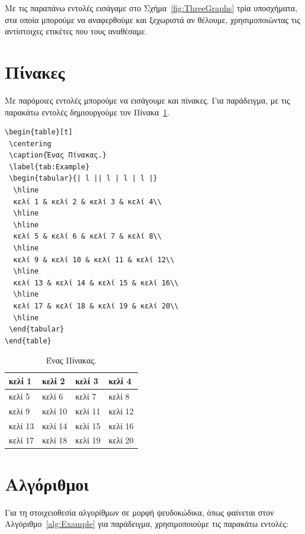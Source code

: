 Με τις παραπάνω εντολές εισάγαμε στο Σχήμα~\ref{fig:ThreeGraphs} τρία υποσχήματα, στα οποία μπορούμε να αναφερθούμε και ξεχωριστά αν θέλουμε, χρησιμοποιώντας τις αντίστοιχες ετικέτες που τους αναθέσαμε.


\section{Πίνακες}
\label{sec:Tables}
Με παρόμοιες εντολές μπορούμε να εισάγουμε και πίνακες.
Για παράδειγμα, με τις παρακάτω εντολές δημιουργούμε τον Πίνακα~\ref{tab:Example}.

\begin{verbatim}
\begin{table}[t]
 \centering
 \caption{Ένας Πίνακας.}
 \label{tab:Example}
 \begin{tabular}{| l || l | l | l |}
  \hline
  κελί 1 & κελί 2 & κελί 3 & κελί 4\\
  \hline
  \hline
  κελί 5 & κελί 6 & κελί 7 & κελί 8\\
  \hline
  κελί 9 & κελί 10 & κελί 11 & κελί 12\\
  \hline
  κελί 13 & κελί 14 & κελί 15 & κελί 16\\
  \hline
  κελί 17 & κελί 18 & κελί 19 & κελί 20\\
  \hline
 \end{tabular}
\end{table}
\end{verbatim}

\begin{table}[t]
	\centering
	\caption{Ένας Πίνακας.}
	\label{tab:Example}
	\begin{tabular}{| l || l | l | l |}
		\hline
		κελί 1 & κελί 2 & κελί 3 & κελί 4\\
		\hline
		\hline
		κελί 5 & κελί 6 & κελί 7 & κελί 8\\
		\hline
		κελί 9 & κελί 10 & κελί 11 & κελί 12\\
		\hline
		κελί 13 & κελί 14 & κελί 15 & κελί 16\\
		\hline
		κελί 17 & κελί 18 & κελί 19 & κελί 20\\
		\hline
	\end{tabular}
\end{table}


\section{Αλγόριθμοι}
\label{sec:Algorithms}
Για τη στοιχειοθεσία αλγορίθμων σε μορφή ψευδοκώδικα, όπως φαίνεται στον Αλγόριθμο~\ref{alg:Example} για παράδειγμα, χρησιμοποιούμε τις παρακάτω εντολές:


